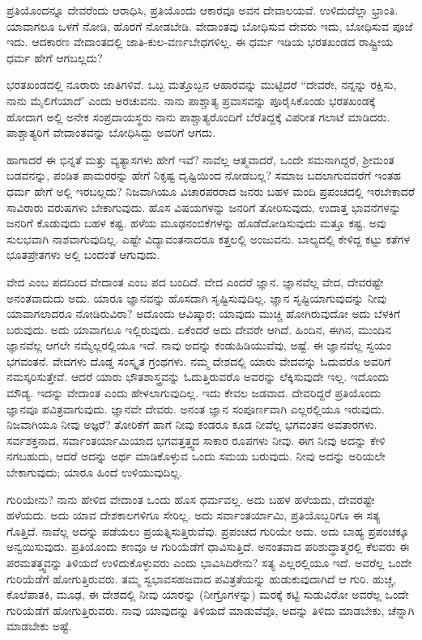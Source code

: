 ಪ್ರತಿಯೊಂದನ್ನೂ ದೇವರೆಂದು ಆರಾಧಿಸಿ, ಪ್ರತಿಯೊಂದು ಆಕಾರವೂ ಅವನ ದೇವಾಲಯವೆ. ಉಳಿದುದೆಲ್ಲಾ ಭ್ರಾಂತಿ. ಯಾವಾಗಲೂ ಒಳಗೆ ನೋಡಿ, ಹೊರಗೆ ನೋಡಬೇಡಿ. ವೇದಾಂತವು ಬೋಧಿಸುವ ದೇವರು ಇದು, ಬೋಧಿಸುವ ಪೂಜೆ ಇದು. ಆದಕಾರಣ ವೇದಾಂತದಲ್ಲಿ ಜಾತಿ-ಕುಲ-ವರ್ಣಬೇಧಗಳಿಲ್ಲ. ಈ ಧರ್ಮ ಇಡಿಯ ಭರತಖಂಡದ ರಾಷ್ಟ್ರೀಯ ಧರ್ಮ ಹೇಗೆ ಆಗಬಲ್ಲದು?

ಭರತಖಂಡದಲ್ಲಿ ನೂರಾರು ಜಾತಿಗಳಿವೆ. ಒಬ್ಬ ಮತ್ತೊಬ್ಬನ ಆಹಾರವನ್ನು ಮುಟ್ಟಿದರೆ “ದೇವರೇ, ನನ್ನನ್ನು ರಕ್ಷಿಸು, ನಾನು ಮೈಲಿಗೆಯಾದೆ' ಎಂದು ಅರಚುವನು. ನಾನು ಪಾಶ್ಚಾತ್ಯ ಪ್ರವಾಸವನ್ನು ಪೂರೈಸಿಕೊಂಡು ಭರತಖಂಡಕ್ಕೆ ಹೋದಾಗ ಅಲ್ಲಿ ಅನೇಕ ಸಂಪ್ರದಾಯಸ್ಥರು ನಾನು ಪಾಶ್ಚಾತ್ಯರೊಂದಿಗೆ ಬೆರೆತಿದ್ದಕ್ಕೆ ವಿಪರೀತ ಗಲಾಟೆ ಮಾಡಿದರು. ಪಾಶ್ಚಾತ್ಯರಿಗೆ ವೇದಾಂತವನ್ನು ಬೋಧಿಸಿದ್ದು ಅವರಿಗೆ ಆಗದು.

ಹಾಗಾದರೆ ಈ ಭಿನ್ನತೆ ಮತ್ತು ವ್ಯತ್ಯಾಸಗಳು ಹೇಗೆ ಇವೆ? ನಾವೆಲ್ಲ ಆತ್ಮವಾದರೆ, ಒಂದೇ ಸಮನಾಗಿದ್ದರೆ, ಶ‍್ರೀಮಂತ ಬಡವನನ್ನು, ಪಂಡಿತ ಪಾಮರರನ್ನು ಹೇಗೆ ನಿಕೃಷ್ಟ ದೃಷ್ಟಿಯಿಂದ ನೋಡಬಲ್ಲ? ಸಮಾಜ ಬದಲಾಗುವವರೆಗೆ ಇಂತಹ ಧರ್ಮ ಹೇಗೆ ಅಲ್ಲಿ ಇರಬಲ್ಲದು? ನಿಜವಾಗಿಯೂ ವಿಚಾರಪರರಾದ ಜನರು ಬಹಳ ಮಂದಿ ಪ್ರಪಂಚದಲ್ಲಿ ಇರಬೇಕಾದರೆ ಸಾವಿರಾರು ವರುಷಗಳು ಬೇಕಾಗುವುದು. ಹೊಸ ವಿಷಯಗಳನ್ನು ಜನರಿಗೆ ತೋರಿಸುವುದು, ಉದಾತ್ತ ಭಾವನೆಗಳನ್ನು ಜನರಿಗೆ ಕೊಡುವುದು ಬಹಳ ಕಷ್ಟ. ಹಳೆಯ ಮೂಢನಂಬಿಕೆಗಳನ್ನು ಹೊಡೆದೋಡಿಸುವುದು ಮತ್ತೂ ಕಷ್ಟ. ಅವು ಸುಲಭವಾಗಿ ನಾಶವಾಗುವುದಿಲ್ಲ. ಎಷ್ಟೇ ವಿದ್ಯಾವಂತನಾದರೂ ಕತ್ತಲಲ್ಲಿ ಅಂಜುವನು. ಬಾಲ್ಯದಲ್ಲಿ ಕೇಳಿದ್ದ ಕಟ್ಟು ಕತೆಗಳ ಭೂತಪ್ರೇತಗಳು ಅಲ್ಲಿ ಬಂದಂತೆ ಆಗುವುದು.

ವೇದ ಎಂಬ ಪದದಿಂದ ವೇದಾಂತ ಎಂಬ ಪದ ಬಂದಿದೆ. ವೇದ ಎಂದರೆ ಜ್ಞಾನ. ಜ್ಞಾನವೆಲ್ಲ ವೇದ, ದೇವರಷ್ಟೇ ಅನಂತವಾದುದು ಅದು. ಯಾರೂ ಜ್ಞಾನವನ್ನು ಹೊಸದಾಗಿ ಸೃಷ್ಟಿಸುವುದಿಲ್ಲ. ಜ್ಞಾನ ಸೃಷ್ಟಿಯಾಗುವುದನ್ನು ನೀವು ಯಾವಾಗಲಾದರೂ ನೋಡಿರುವಿರಾ? ಅದೊಂದು ಆವಿಷ್ಕಾರ; ಯಾವುದು ಮುಚ್ಚಿ ಹೋಗಿರುವುದೋ ಅದು ಬೆಳಕಿಗೆ ಬರುವುದು. ಅದು ಯಾವಾಗಲೂ ಇಲ್ಲಿರುವುದು. ಏಕೆಂದರೆ ಅದು ದೇವರೇ ಆಗಿದೆ. ಹಿಂದಿನ, ಈಗಿನ, ಮುಂದಿನ ಜ್ಞಾನವೆಲ್ಲ ಆಗಲೇ ನಮ್ಮೆಲ್ಲರಲ್ಲಿಯೂ ಇದೆ. ನಾವು ಅದನ್ನು ಕಂಡುಹಿಡಿಯುವೆವು, ಅಷ್ಟೆ. ಈ ಜ್ಞಾನವೆಲ್ಲ ಸ್ವಯಂ ಭಗವಂತನೆ. ವೇದಗಳು ದೊಡ್ಡ ಸಂಸ್ಕೃತ ಗ್ರಂಥಗಳು. ನಮ್ಮ ದೇಶದಲ್ಲಿ ಯಾರು ವೇದವನ್ನು ಓದುವರೊ ಅವರಿಗೆ ನಮಸ್ಕರಿಸುತ್ತೇವೆ. ಆದರೆ ಯಾರು ಭೌತಶಾಸ್ತ್ರವನ್ನು ಓದುತ್ತಿರುವರೊ ಅವರನ್ನು ಲೆಕ್ಕಿಸುವುದೇ ಇಲ್ಲ. ಇದೊಂದು ಮೌಡ್ಯ. ಇದನ್ನು ವೇದಾಂತ ಎಂದು ಹೇಳಲಾಗುವುದಿಲ್ಲ. ಇದು ಕೇವಲ ಜಡವಾದ. ದೇವರಿದ್ದರೆ ಪ್ರತಿಯೊಂದು ಜ್ಞಾನವೂ ಪವಿತ್ರವಾಗುವುದು. ಜ್ಞಾನವೇ ದೇವರು. ಅನಂತ ಜ್ಞಾನ ಸಂಪೂರ್ಣವಾಗಿ ಎಲ್ಲರಲ್ಲಿಯೂ ಇರುವುದು. ನಿಜವಾಗಿಯೂ ನೀವು ಅಜ್ಞರೆ? ತೋರಿಕೆಗೆ ಹಾಗೆ ನೀವು ಕಂಡರೂ ಕೂಡ ನೀವೆಲ್ಲ ಭಗವಂತನ ಅವತಾರಗಳು. ಸರ್ವಶಕ್ತನಾದ, ಸರ್ವಾಂತರ್ಯಾಮಿಯಾದ ಭಗವತ್ತತ್ತ್ವದ ಸಾಕಾರ ರೂಪಗಳು ನೀವು. ಈಗ ನೀವು ಅದನ್ನು ಕೇಳಿ ನಗಬಹುದು, ಆದರೆ ಅದನ್ನು ಅರ್ಥ ಮಾಡಿಕೊಳ್ಳುವ ಒಂದು ಸಮಯ ಬರುವುದು. ನೀವು ಅದನ್ನು ಅರಿಯಲೇ ಬೇಕಾಗುವುದು; ಯಾರೂ ಹಿಂದೆ ಉಳಿಯುವುದಿಲ್ಲ.

ಗುರಿಯೇನು? ನಾನು ಹೇಳಿದ ವೇದಾಂತ ಒಂದು ಹೊಸ ಧರ್ಮವಲ್ಲ. ಅದು ಬಹಳ ಹಳೆಯದು, ದೇವರಷ್ಟೇ ಹಳೆಯದು. ಅದು ಯಾವ ದೇಶಕಾಲಗಳಿಗೂ ಸೇರಿಲ್ಲ. ಅದು ಸರ್ವಾಂತರ್ಯಾಮಿ, ಪ್ರತಿಯೊಬ್ಬರಿಗೂ ಈ ಸತ್ಯ ಗೊತ್ತಿದೆ. ನಾವೆಲ್ಲ ಅದನ್ನು ಪಡೆಯಲು ಪ್ರಯತ್ನಿಸುತ್ತಿರುವೆವು. ಪ್ರಪಂಚದ ಗುರಿಯೇ ಅದು. ಅದು ಬಾಹ್ಯ ಪ್ರಪಂಚಕ್ಕೂ ಅನ್ವಯಿಸುವುದು. ಪ್ರತಿಯೊಂದು ಕಣವೂ ಆ ಗುರಿಯೆಡೆಗೆ ಧಾವಿಸುತ್ತಿದೆ. ಅನಂತವಾದ ಪರಿಶುದ್ಧಾತ್ಮರಲ್ಲಿ ಕೆಲವರು ಈ ಪರಮತತ್ತ್ವವನ್ನು ತಿಳಿಯದೆ ಉಳಿದುಕೊಳ್ಳುವರು ಎಂದು ಭಾವಿಸಿದಿರೇನು? ಸತ್ಯ ಎಲ್ಲರಲ್ಲಿಯೂ ಇದೆ. ಅವರೆಲ್ಲ ಒಂದೇ ಗುರಿಯೆಡೆಗೆ ಹೋಗುತ್ತಿರುವರು. ತಮ್ಮ ಸ್ವಭಾವಸಹಜವಾದ ಪವಿತ್ರತೆಯನ್ನು ಹುಡುಕುವುದಾಗಿದೆ ಆ ಗುರಿ. ಹುಚ್ಚ, ಕೊಲೆಪಾತಕಿ, ಮೂಢ, ಈ ದೇಶದಲ್ಲಿ ನೀವು ಯಾರನ್ನು (ನೀಗ್ರೊಗಳನ್ನು) ಮರಕ್ಕೆ ಕಟ್ಟಿ ಸುಡುವಿರೋ ಅವರೆಲ್ಲ ಒಂದೇ ಗುರಿಯೆಡೆಗೆ ಹೋಗುತ್ತಿರುವರು. ನಾವು ಯಾವುದನ್ನು ತಿಳಿಯದೆ ಮಾಡುವೆವೊ, ಅದನ್ನು ತಿಳಿದು ಮಾಡಬೇಕು, ಚೆನ್ನಾಗಿ ಮಾಡಬೇಕು ಅಷ್ಟೆ.

